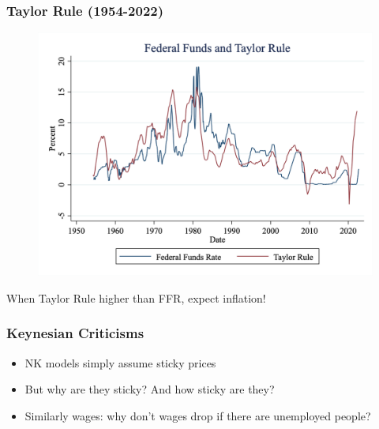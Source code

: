 \documentclass{beamer}
\begin{document}
\begin{frame}
\frametitle[alignment=center]{Taylor Rule (1954-2022)}
\begin{figure}
\centering
\includegraphics[scale=0.25]{Figures/FedFunds3.png}
\end{figure}
When Taylor Rule higher than FFR, expect inflation!
\end{frame}

\begin{frame}
\frametitle[alignment=center]{Keynesian Criticisms}
\begin{itemize}
\item NK models simply assume sticky prices
\bigskip
\item But why are they sticky?  And how sticky are they?
\bigskip
\item Similarly wages:  why don't wages drop if there are unemployed people?
\end{itemize}
\end{frame}
\end{document}
